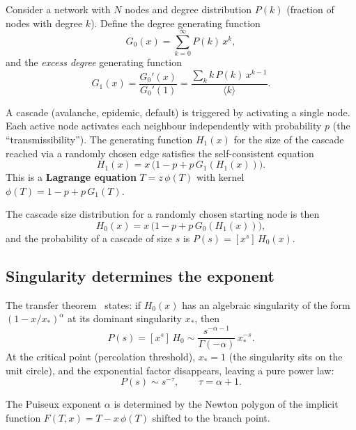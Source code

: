 \documentclass[11pt,a4paper]{article}
\theoremstyle{definition}
\begin{document}
Consider a network with $N$ nodes and degree distribution $P(k)$
(fraction of nodes with degree $k$). Define the degree generating
function
\begin{equation}
G_0(x) = \sum_{k=0}^{\infty} P(k)\, x^k,
\end{equation}
and the \emph{excess degree} generating function
\begin{equation}
G_1(x) = \frac{G_0'(x)}{G_0'(1)} = \frac{\sum_k k\,P(k)\,x^{k-1}}{\langle k \rangle}.
\end{equation}

A cascade (avalanche, epidemic, default) is triggered by activating
a single node. Each active node activates each neighbour independently
with probability $p$ (the ``transmissibility''). The generating function
$H_1(x)$ for the size of the cascade reached via a randomly chosen edge
satisfies the self-consistent equation~\cite{newman2001}
\begin{equation}
H_1(x) = x\,\bigl(1 - p + p\,G_1(H_1(x))\bigr).
\label{eq:cascade_lagrange}
\end{equation}
This is a \textbf{Lagrange equation} $T = z\,\phi(T)$ with kernel
$\phi(T) = 1 - p + p\,G_1(T)$.

The cascade size distribution for a randomly chosen starting node is
then
\begin{equation}
H_0(x) = x\,\bigl(1 - p + p\,G_0(H_1(x))\bigr),
\end{equation}
and the probability of a cascade of size $s$ is $P(s) = [x^s]\,H_0(x)$.

\subsection{Singularity determines the exponent}

The transfer theorem~\cite{flajolet2009} states: if $H_0(x)$ has an
algebraic singularity of the form $(1 - x/x_*)^{\alpha}$ at its
dominant singularity $x_*$, then
\begin{equation}
P(s) = [x^s]\,H_0 \sim \frac{s^{-\alpha - 1}}{\Gamma(-\alpha)}\, x_*^{-s}.
\end{equation}
At the critical point (percolation threshold), $x_* = 1$ (the
singularity sits on the unit circle), and the exponential factor
disappears, leaving a pure power law:
\begin{equation}
P(s) \sim s^{-\tau}, \qquad \tau = \alpha + 1.
\end{equation}

The Puiseux exponent $\alpha$ is determined by the Newton polygon of
the implicit function $F(T, x) = T - x\,\phi(T)$ shifted to the
branch point.
\end{document}
